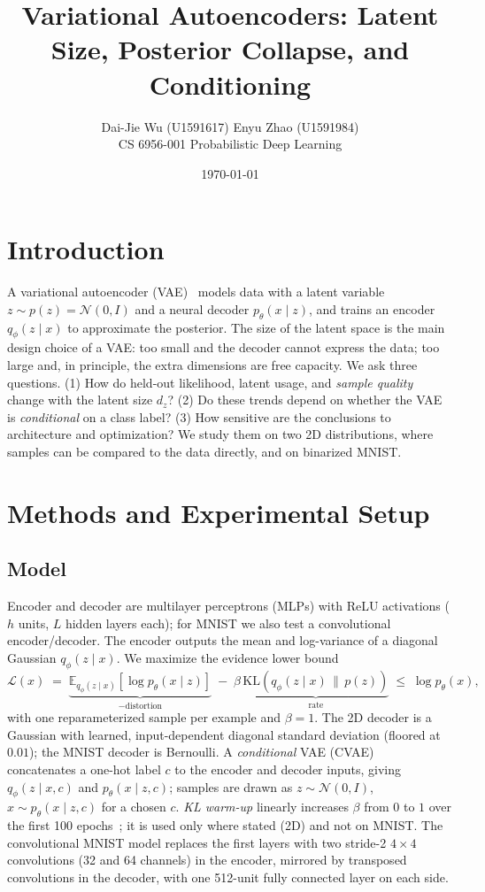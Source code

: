 \documentclass[10pt]{article}
\title{Variational Autoencoders: Latent Size, Posterior Collapse, and Conditioning}
\author{Dai-Jie Wu (U1591617) \qquad Enyu Zhao (U1591984) \\[0.4em]
\normalsize CS 6956-001 Probabilistic Deep Learning}
\date{\today}
\begin{document}
\maketitle

\section{Introduction}
A variational autoencoder (VAE)~\cite{kingma2014} models data with a latent
variable $z\sim p(z)=\mathcal N(0,I)$ and a neural decoder $p_\theta(x\mid
z)$, and trains an encoder $q_\phi(z\mid x)$ to approximate the posterior.
The size of the latent space is the main design choice of a VAE: too small
and the decoder cannot express the data; too large and, in principle, the
extra dimensions are free capacity. We ask three questions. (1) How do
held-out likelihood, latent usage, and \emph{sample quality} change with the
latent size $d_z$? (2) Do these trends depend on whether the VAE is
\emph{conditional} on a class label? (3) How sensitive are the conclusions to
architecture and optimization? We study them on two 2D distributions, where
samples can be compared to the data directly, and on binarized MNIST.

\section{Methods and Experimental Setup}

\subsection{Model}
Encoder and decoder are multilayer perceptrons (MLPs) with ReLU activations
($h$ units, $L$ hidden layers each); for MNIST we also test a convolutional
encoder/decoder. The encoder outputs the mean and log-variance of a diagonal
Gaussian $q_\phi(z\mid x)$. We maximize the evidence lower bound
\begin{equation}
  \mathcal L(x) \;=\; \underbrace{\mathbb E_{q_\phi(z\mid x)}\!\left[\log p_\theta(x\mid z)\right]}_{-\text{distortion}}
  \;-\; \beta\,\underbrace{\mathrm{KL}\!\left(q_\phi(z\mid x)\,\|\,p(z)\right)}_{\text{rate}}
  \;\le\; \log p_\theta(x),
\end{equation}
with one reparameterized sample per example and $\beta=1$. The 2D decoder is a
Gaussian with learned, input-dependent diagonal standard deviation (floored at
$0.01$); the MNIST decoder is Bernoulli. A \emph{conditional} VAE
(CVAE)~\cite{sohn2015} concatenates a one-hot label $c$ to the encoder and
decoder inputs, giving $q_\phi(z\mid x,c)$ and $p_\theta(x\mid z,c)$; samples
are drawn as $z\sim\mathcal N(0,I)$, $x\sim p_\theta(x\mid z,c)$ for a chosen
$c$. \emph{KL warm-up} linearly increases $\beta$ from $0$ to $1$ over the
first 100 epochs~\cite{bowman2016}; it is used only where stated (2D) and
not on MNIST. The convolutional MNIST model replaces the first layers with
two stride-2 $4\times4$ convolutions (32 and 64 channels) in the encoder,
mirrored by transposed convolutions in the decoder, with one 512-unit
fully connected layer on each side.
\end{document}

